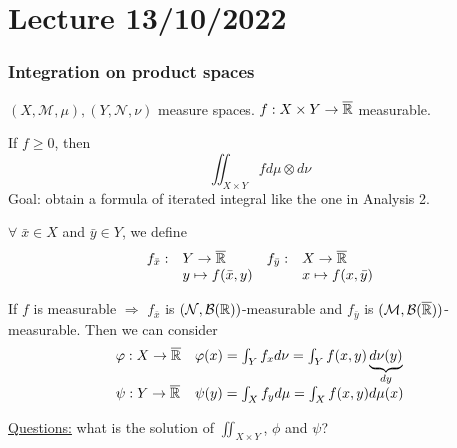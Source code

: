 \section{Lecture 13/10/2022}
\subsubsection*{Integration on product spaces}
\((X, \mathcal{M}, \mu), (Y, \mathcal{N},\nu)\) measure spaces. \(f : X \times Y \to \overline{\mathbb{R}}\) measurable.

If \(f \geq 0\), then 
\[
    \iint_{X \times Y} f d\mu\otimes d\nu
\]
Goal: obtain a formula of iterated integral like the one in Analysis 2.

\(\forall \; \bar{x} \in X\) and \(\bar{y} \in Y\), we define
\[
    \begin{array}{llll}
        f_{\bar{x}} :& Y \to \overline{\mathbb{R}} & f_{\bar{y}}:& X \to \overline{\mathbb{R}}  \\
        & y \mapsto f(\bar{x}, y) & & x \mapsto f(x, \bar{y})

    \end{array}
\]
\begin{proposition}
    If \(f\) is measurable \(\Rightarrow\) \(f_{\bar{x}}\) is \((\mathcal{N}, \mathcal{B}(\mathbb{R}))\)-measurable and \(f_{\bar{y}}\) is \((\mathcal{M}, \mathcal{B}(\overline{\mathbb{R}}))\)-measurable.
    Then we can consider
    \[
        \begin{array}{ll}    
        \varphi : X \to \overline{\mathbb{R}} & 
        \varphi(x) = \int_Y f_x d\nu = \int_Y f(x,y) \underbrace{d\nu(y)}_{dy} \\
        \psi : Y \to \overline{\mathbb{R}} &
        \psi(y) = \int_X f_y d\mu = \int_X f(x,y) d\mu(x)
    \end{array}
    \]
\end{proposition}
\underline{Questions:} what is the solution of \(\iint_{X \times Y}\), \(\phi\) and \(\psi\)?


